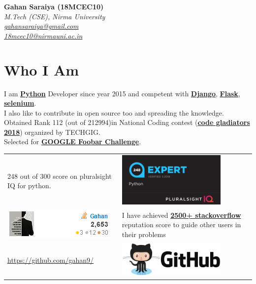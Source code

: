 \documentclass[a4paper, 14pt]{article}
\begin{document}
	\begin{flushright}
		{\large \hfill \textbf{Gahan Saraiya (18MCEC10)}} \\
		\textit{
			M.Tech (CSE), Nirma University \\
			\url{gahansaraiya@gmail.com} \\
			\url{18mcec10@nirmauni.ac.in}
		}
	\end{flushright}	
	\section*{Who I Am}
	I am \href{https://www.python.org/}{\textbf{Python}} Developer since year 2015 and competent with \href{https://www.djangoproject.com/}{\textbf{Django}}, \href{http://flask.pocoo.org/}{\textbf{Flask}}, \href{https://selenium-python.readthedocs.io/}{\textbf{selenium}}.
	\\ I also like to contribute in open source too and spreading the knowledge.
	\\ Obtained Rank 112 (out of 212994)in	National Coding contest (\href{https://www.techgig.com/codegladiators}{\textbf{code gladiators 2018}}) organized by TECHGIG.
	\\ Selected for \href{https://medium.com/magentacodes/things-you-should-know-about-google-foobar-invitation-703a535bf30f}{\textbf{GOOGLE Foobar Challenge}}.
	\begin{table}[H]
		\centering
		\begin{tabular}{ L L }
			248 out of 300 score on pluralsight IQ for python. 
			& 
			{\includegraphics[width=200px]{assets/pyIQ248.png}}
		\\ 
			\href{https://stackoverflow.com/users/flair/7664524.png}{\includegraphics{assets/so7664524.png}}
			& 
			I have achieved \href{https://stackoverflow.com/users/story/7664524}{\textbf{2500+ stackoverflow}}	reputation score to guide other users in their problems
		\\ 
			\url{https://github.com/gahan9/}
			& 
			\href{https://github.com/gahan9/}{\includegraphics[width=200px]{assets/github-logo.png}}
		\end{tabular}
	\end{table}
	
\end{document}
